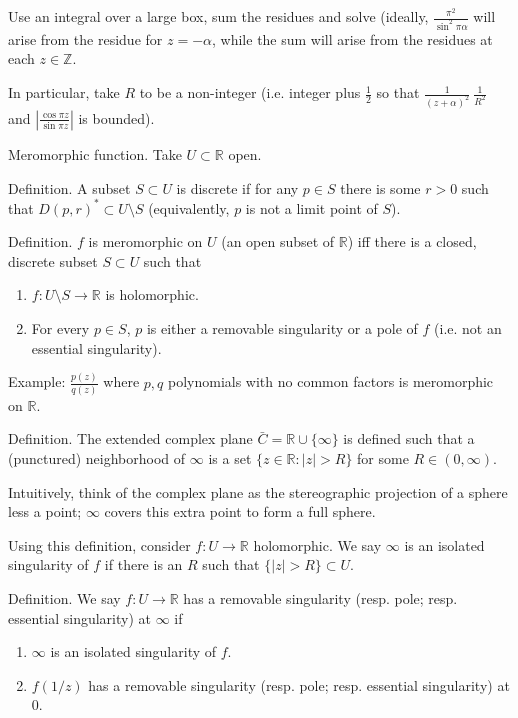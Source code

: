 \documentclass{artikel3}
\newcommand{\abs}[1]{\left|#1\right|}
\newcommand{\integers}{\mathbb{Z}}
\newcommand{\complex}{\mathbb{R}}
\numberwithin{equation}{enumi}
\begin{document}
Use an integral over a large box, sum the residues and solve
(ideally, $\frac{\pi^2}{\sin^2\pi\alpha}$ will arise from
the residue for $z=-\alpha$, while the sum will arise from
the residues at each $z\in\integers$.

In particular, take $R$ to be a non-integer (i.e. integer
plus $\frac{1}{2}$ so that $\frac{1}{(z+\alpha)^2}~\frac{1}{R^2}$
and $\abs{\frac{\cos \pi z}{\sin \pi z}}$ is bounded).

Meromorphic function.  Take $U\subset \complex$ open.

Definition. A subset $S\subset U$ is discrete if for any $p\in S$
there is some $r>0$ such that $D(p,r)^*\subset U\setminus S$
(equivalently, $p$ is not a limit point of $S$).

Definition. $f$ is meromorphic on $U$ (an open
subset of $\complex$) iff there is a closed, discrete
subset $S\subset U$ such that
\begin{enumerate}
	\item
		$f:U\setminus S\to \complex$ is holomorphic.
	\item
		For every $p\in S$, $p$ is either a removable
		singularity or a pole of $f$ (i.e. not an essential
		singularity).
\end{enumerate}

Example: $\frac{p(z)}{q(z)}$ where $p,q$ polynomials
with no common factors is meromorphic on $\complex$.

Definition.  The extended complex plane $\bar{C}=\complex\cup\{\infty\}$
is defined such that a (punctured) neighborhood of $\infty$ is a set
$\{z\in\complex:\abs{z}>R\}$ for some $R\in (0,\infty)$.

Intuitively, think of the complex plane as the stereographic projection
of a sphere less a point; $\infty$ covers this extra point to form a full
sphere.

Using this definition, consider $f:U\to\complex$ holomorphic.
We say $\infty$ is an isolated singularity of $f$ if there is
an $R$ such that $\{\abs{z}>R\}\subset U$.

Definition. We say $f:U\to\complex$ has a removable singularity
(resp. pole; resp. essential singularity) at $\infty$ if
\begin{enumerate}
	\item
		$\infty$ is an isolated singularity of $f$.
	\item
		$f(1/z)$ has a removable singularity (resp. pole; resp. essential singularity)
		at $0$.
\end{enumerate}
\end{document}
